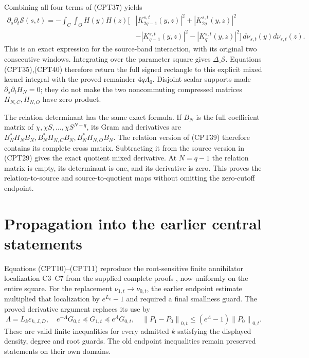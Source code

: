 \documentclass[11pt]{article}
\newcommand{\Scal}{\mathcal S}
\newcommand{\norm}[1]{\left\lVert#1\right\rVert}
\begin{document}
Combining all four terms of (CPT37) yields
\begin{equation}\tag{CPT40}
\begin{split}
 \partial_s\partial_t\Scal(s,t)
 =-\int_C\int_O H(y)H(z)\big[
 &|K_{2q-1}^{s,t}(y,z)|^2+|K_{2q}^{s,t}(y,z)|^2\\
 &-|K_{q-1}^{s,t}(y,z)|^2-|K_q^{s,t}(y,z)|^2
 \big]\,d\nu_{s,t}(y)d\nu_{s,t}(z).
\end{split}
\end{equation}
This is an exact expression for the source-band interaction,
with its original two consecutive windows.  Integrating over
the parameter square gives \(\Delta_\square\Scal\).
Equations (CPT35),(CPT40) therefore return the full signed
rectangle to this explicit mixed kernel integral with the
proved remainder \(4q\Lambda_0\).
Disjoint scalar supports made \(\partial_s\partial_tH_N=0\);
they do not make the two noncommuting compressed matrices
\(H_{N,C},H_{N,O}\) have zero product.

The relation determinant has the same exact formula.
If \(B_N\) is the full coefficient matrix of
\(\chi,\chi S,\ldots,\chi S^{N-q}\), its Gram and derivatives
are \(B_N^*H_NB_N,B_N^*H_{N,C}B_N,B_N^*H_{N,O}B_N\).
The relation version of (CPT39) therefore contains its complete
cross matrix.  Subtracting it from the source version in
(CPT29) gives the exact quotient mixed derivative.  At
\(N=q-1\) the relation matrix is empty, its determinant is one,
and its derivative is zero.  This proves the relation-to-source
and source-to-quotient maps without omitting the zero-cutoff
endpoint.

\section{Propagation into the earlier central statements}

Equations (CPT10)--(CPT11) reproduce the root-sensitive finite
annihilator localization C3--C7 from the supplied complete
proofs \cite{complete}, now uniformly on the entire square.
For the replacement \(\nu_{1,t}\to\nu_{0,t}\), the earlier
endpoint estimate multiplied that localization by
\(e^{L_k}-1\) and required a final smallness guard.
The proved derivative argument replaces its use by
\[
 \Lambda=L_k\varepsilon_{k,J,D},\quad
 e^{-\Lambda}G_{0,t}\preceq G_{1,t}\preceq e^\Lambda G_{0,t},
 \quad
 \norm{P_1-P_0}_{0,t}\le(e^\Lambda-1)\norm{P_0}_{0,t}.
\]
These are valid finite inequalities for every admitted
\(k\) satisfying the displayed density, degree and root guards.
The old endpoint inequalities remain preserved statements
on their own domains.
\end{document}
